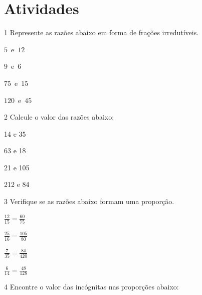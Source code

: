 \section*{Atividades}

\num{1} Represente as razões abaixo em forma de frações irredutíveis.

\begin{escolha}[itemsep=0pt]
\item $5$\ e\ $12$  
\item $9$\ e\ $6$  
\item $75$\ e\ $15$  
\item $120$\ e\ $45$  
\end{escolha}

\num{2} Calcule o valor das razões abaixo:

\begin{escolha}[itemsep=0pt]
\item 14 e 35  
\item 63 e 18  
\item 21 e 105  
\item 212 e 84  
\end{escolha}


\num{3} Verifique se as razões abaixo formam uma proporção.

\begin{escolha}[itemsep=0pt]
\item $\frac{12}{15} = \frac{60}{75}$  
\item $\frac{25}{16} = \frac{105}{80}$  
\item $\frac{7}{35} = \frac{84}{420}$  
\item $\frac{6}{14} = \frac{48}{128}$  
\end{escolha}

\num{4} Encontre o valor das incógnitas nas proporções abaixo:

